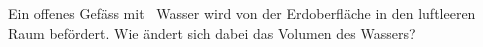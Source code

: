 Ein offenes Gefäss mit \VwvO\ Wasser wird von der Erdoberfläche in den luftleeren Raum befördert. Wie ändert sich dabei das Volumen des Wassers?
